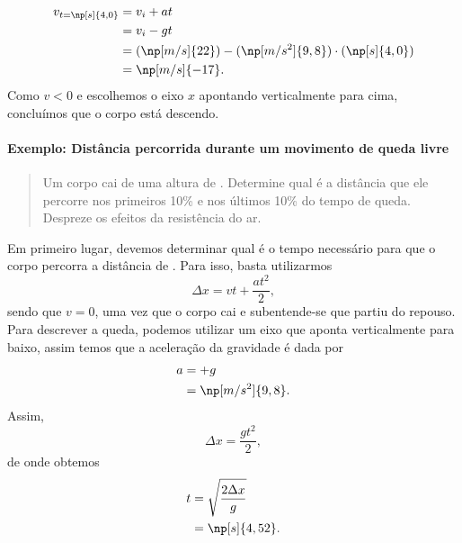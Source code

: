 \begin{align}
    v_{t=\np[s]{4,0}} &= v_i + at \\
    &= v_i - gt \\
    &= (\np[m/s]{22}) - (\np[m/s^2]{9,8})\cdot(\np[s]{4,0}) \\
    &= \np[m/s]{-17}.
\end{align}
%
Como $v < 0$ e escolhemos o eixo $x$ apontando verticalmente para cima, concluímos que o corpo está descendo.

\paragraph{Exemplo: Distância percorrida durante um movimento de queda livre}

\begin{quote}
	Um corpo cai de uma altura de . Determine qual é a distância que ele percorre nos primeiros 10\% e nos últimos 10\% do tempo de queda. Despreze os efeitos da resistência do ar.
\end{quote}

Em primeiro lugar, devemos determinar qual é o tempo necessário para que o corpo percorra a distância de . Para isso, basta utilizarmos
\begin{equation}
	\Delta x = vt + \frac{at^2}{2},
\end{equation}
%
sendo que $v = 0$, uma vez que o corpo cai e subentende-se que partiu do repouso. Para descrever a queda, podemos utilizar um eixo que aponta verticalmente para baixo, assim temos que a aceleração da gravidade é dada por
\begin{align}
	a &= +g \\
	&= \np[m/s^2]{9,8}.
\end{align}
%
Assim,
\begin{equation}
	\Delta x = \frac{gt^2}{2},
\end{equation}
%
de onde obtemos
\begin{align}
	t &= \sqrt{\frac{2 \Delta x}{g}} \\
	&= \np[s]{4,52}.
\end{align}

